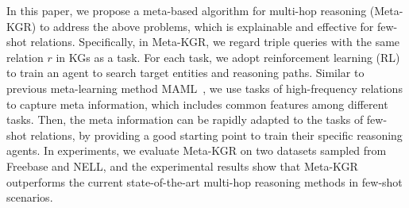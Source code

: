 \documentclass[11pt,a4paper]{article}
\begin{document}
In this paper, we propose a meta-based algorithm for multi-hop reasoning (Meta-KGR) to address the above problems, which is explainable and effective for few-shot relations. Specifically, in Meta-KGR, we regard triple queries with the same relation $r$ in KGs as a task. For each task, we adopt reinforcement learning (RL) to train an agent to search target entities and reasoning paths. Similar to previous meta-learning method MAML~\cite{MAML}, we use tasks of high-frequency relations to capture meta information, which includes common features among different tasks. Then, the meta information can be rapidly adapted to the tasks of few-shot relations, by providing a good starting point to train their specific reasoning agents. In experiments, we evaluate Meta-KGR on two datasets sampled from Freebase and NELL, and the experimental results show that Meta-KGR outperforms  the current state-of-the-art multi-hop reasoning methods in few-shot scenarios.  



\end{document}
